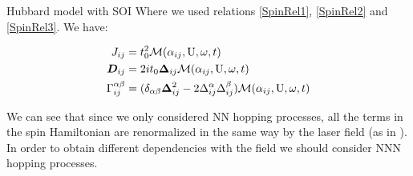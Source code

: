 \begin{section}{Hubbard model with SOI}
Where we used relations \ref{SpinRel1}, \ref{SpinRel2} and \ref{SpinRel3}. We have:

\begin{align}
J_{ij} &= t_0^2\mathcal{M}(\alpha_{ij}, \text{U}, \omega, t) \label{JijHSOI} \\
\boldsymbol{D}_{ij} &= 2it_0\boldsymbol{\Delta}_{ij} \mathcal{M}(\alpha_{ij}, \text{U}, \omega, t) \label{DijHSOI} \\
\Gamma_{ij}^{\alpha \beta} &= (\delta_{\alpha \beta} \boldsymbol{\Delta}_{ij}^2 - 2\Delta_{ij}^\alpha\Delta_{ij}^\beta )\mathcal{M}(\alpha_{ij}, \text{U}, \omega, t)
\end{align}

We can see that since we only considered NN hopping processes, all the terms in the spin Hamiltonian are renormalized in the same way by the laser field (as in \cite{Stepanov2017}). In order to obtain different dependencies with the field we should consider NNN hopping processes.

\end{section}